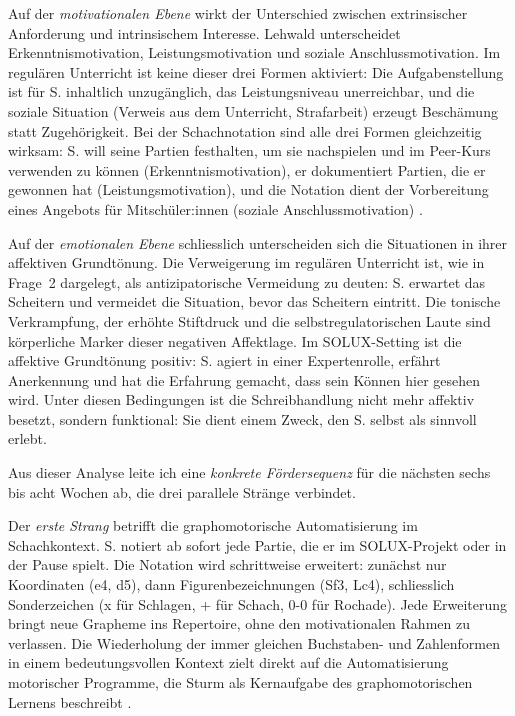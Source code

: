 \documentclass[ngerman, a4paper]{article}
\begin{document}
Auf der \textit{motivationalen Ebene} wirkt der Unterschied zwischen extrinsischer
Anforderung und intrinsischem Interesse. Lehwald unterscheidet Erkenntnismotivation,
Leistungsmotivation und soziale Anschlussmotivation. Im regulären Unterricht ist
keine dieser drei Formen aktiviert: Die Aufgabenstellung ist für S. inhaltlich
unzugänglich, das Leistungsniveau unerreichbar, und die soziale Situation (Verweis
aus dem Unterricht, Strafarbeit) erzeugt Beschämung statt Zugehörigkeit. Bei der
Schachnotation sind alle drei Formen gleichzeitig wirksam: S. will seine Partien
festhalten, um sie nachspielen und im Peer-Kurs verwenden zu können
(Erkenntnismotivation), er dokumentiert Partien, die er gewonnen hat
(Leistungsmotivation), und die Notation dient der Vorbereitung eines Angebots
für Mitschüler:innen (soziale Anschlussmotivation)
\parencite{lehwald2017motivation}.

Auf der \textit{emotionalen Ebene} schliesslich unterscheiden sich die Situationen
in ihrer affektiven Grundtönung. Die Verweigerung im regulären Unterricht ist,
wie in Frage~2 dargelegt, als antizipatorische Vermeidung zu deuten: S. erwartet
das Scheitern und vermeidet die Situation, bevor das Scheitern eintritt. Die
tonische Verkrampfung, der erhöhte Stiftdruck und die selbstregulatorischen Laute
sind körperliche Marker dieser negativen Affektlage. Im SOLUX-Setting ist die
affektive Grundtönung positiv: S. agiert in einer Expertenrolle, erfährt
Anerkennung und hat die Erfahrung gemacht, dass sein Können hier gesehen wird.
Unter diesen Bedingungen ist die Schreibhandlung nicht mehr affektiv besetzt,
sondern funktional: Sie dient einem Zweck, den S. selbst als sinnvoll erlebt.

Aus dieser Analyse leite ich eine \textit{konkrete Fördersequenz} für die nächsten
sechs bis acht Wochen ab, die drei parallele Stränge verbindet.

Der \textit{erste Strang} betrifft die graphomotorische Automatisierung im
Schachkontext. S. notiert ab sofort jede Partie, die er im SOLUX-Projekt oder
in der Pause spielt. Die Notation wird schrittweise erweitert: zunächst nur
Koordinaten (e4, d5), dann Figurenbezeichnungen (Sf3, Lc4), schliesslich
Sonderzeichen (x für Schlagen, + für Schach, 0-0 für Rochade). Jede Erweiterung
bringt neue Grapheme ins Repertoire, ohne den motivationalen Rahmen zu verlassen.
Die Wiederholung der immer gleichen Buchstaben- und Zahlenformen in einem
bedeutungsvollen Kontext zielt direkt auf die Automatisierung motorischer
Programme, die Sturm als Kernaufgabe des graphomotorischen Lernens beschreibt
\parencite{sturm2016graphomotorik}.
\end{document}
